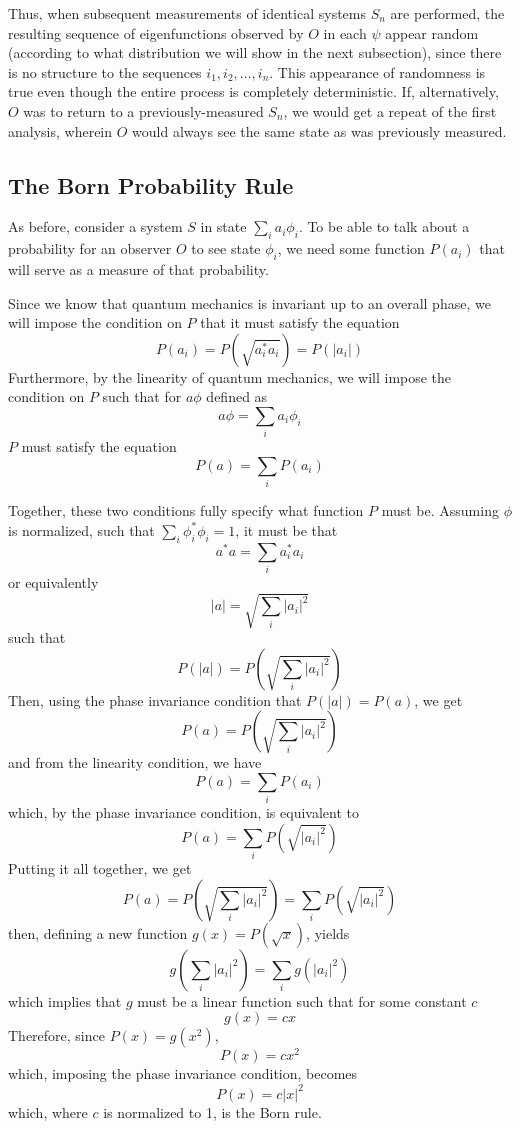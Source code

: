 \documentclass[
    12pt,
    letterpaper,
    aps,
    prd,
    longbibliography,
    twocolumn,
    nofootinbib,
    raggedbottom,
    amsmath,
    amssymb,
    amsfonts,
]{revtex4-1}
\newcommand{\pn}[1]{\left(#1\right)}
\newcommand{\abs}[1]{\left|#1\right|}
\begin{document}
Thus, when subsequent measurements of identical systems $S_n$ are performed, the resulting sequence of eigenfunctions observed by $O$ in each $\psi$ appear random (according to what distribution we will show in the next subsection), since there is no structure to the sequences $i_1, i_2, \ldots, i_n$. This appearance of randomness is true even though the entire process is completely deterministic. If, alternatively, $O$ was to return to a previously-measured $S_n$, we would get a repeat of the first analysis, wherein $O$ would always see the same state as was previously measured.

\subsection{The Born Probability Rule}
\label{sec:born}

As before, consider a system $S$ in state $\sum_i a_i \phi_i$. To be able to talk about a probability for an observer $O$ to see state $\phi_i$, we need some function $P(a_i)$ that will serve as a measure of that probability.

Since we know that quantum mechanics is invariant up to an overall phase, we will impose the condition on $P$ that it must satisfy the equation
\[
    P(a_i) = P\pn{\sqrt{a_i^* a_i}} = P(\abs{a_i})
\]
Furthermore, by the linearity of quantum mechanics, we will impose the condition on $P$ such that for $a \phi$ defined as
\[
    a \phi = \sum_i a_i \phi_i
\]
$P$ must satisfy the equation
\[
    P(a) = \sum_i P(a_i)
\]

Together, these two conditions fully specify what function $P$ must be. Assuming $\phi$ is normalized, such that $\sum_i \phi_i^* \phi_i = 1$, it must be that
\[
    a^* a = \sum_i a_i^* a_i
\]
or equivalently
\[
    \abs{a} = \sqrt{\sum_i \abs{a_i}^2}
\]
such that
\[
    P(\abs{a}) = P\pn{\sqrt{\sum_i \abs{a_i}^2}}
\]
Then, using the phase invariance condition that $P(\abs{a}) = P(a)$, we get
\[
    P(a) = P\pn{\sqrt{\sum_i \abs{a_i}^2}}
\]
and from the linearity condition, we have
\[
    P(a) = \sum_i P(a_i)
\]
which, by the phase invariance condition, is equivalent to
\[
    P(a) = \sum_i P\pn{\sqrt{\abs{a_i}^2}}
\]
Putting it all together, we get
\[
    P(a) = P\pn{\sqrt{\sum_i \abs{a_i}^2}} = \sum_i P\pn{\sqrt{\abs{a_i}^2}}
\]
then, defining a new function $g(x) = P(\sqrt{x})$, yields
\[
    g\pn{\sum_i \abs{a_i}^2} = \sum_i g\pn{\abs{a_i}^2}
\]
which implies that $g$ must be a linear function such that for some constant $c$
\[
    g(x) = c x
\]
Therefore, since $P(x) = g(x^2)$,
\[
    P(x) = c x^2
\]
which, imposing the phase invariance condition, becomes
\[
    P(x) = c \abs{x}^2
\]
which, where $c$ is normalized to 1, is the Born rule.
\end{document}
